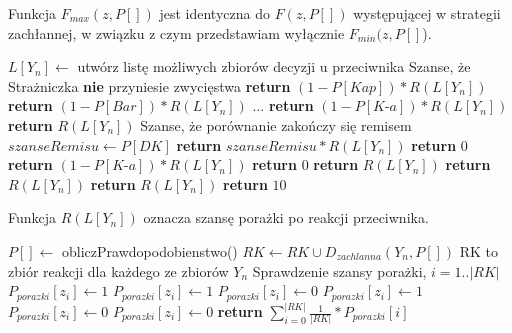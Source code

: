 Funkcja $F_{max}(z, P[])$ jest identyczna do $F(z, P[])$ występującej w strategii zachłannej, w związku z czym przedstawiam wyłącznie $F_{min}(z, P[]$).
\begin{algorithmic}[1]
		\State $L[Y_n] \gets$ utwórz listę możliwych zbiorów decyzji u przeciwnika 
			 \Comment Szanse, że Strażniczka \textbf{nie} przyniesie zwycięstwa
				\State \textbf{return} $ (1 - P[Kap]) * R(L[Y_n]) $
			\EndCase
				\State \textbf{return} $ (1 - P[Bar]) * R(L[Y_n]) $
			\EndCase
				\State ...
				\State \textbf{return} $ (1 - P[\textit{K-a}]) * R(L[Y_n]) $
			\EndCase
				\State \textbf{return} $  R(L[Y_n]) $
			\EndCase
				\Comment Szanse, że porównanie zakończy się remisem 
				\State $ szanseRemisu \gets P[DK]$ 
				\State \textbf{return} $ szanseRemisu * R(L[Y_n]) $
			\EndCase
				\State \textbf{return} $ 0 $
			\EndCase
				\State \textbf{return} $ (1 - P[\textit{K-a}]) * R(L[Y_n]) $
			\EndCase
					\State \textbf{return} $ 0 $
				\Else
					\State \textbf{return} $ R(L[Y_n]) $
				\EndIf
			\EndCase
				\State \textbf{return} $ R(L[Y_n]) $
			\EndCase
				\State \textbf{return} $ R(L[Y_n]) $
			\EndCase
			\State \textbf{return} $ 10 $
			\EndCase
		\EndSwitch
	\EndFunction
\end{algorithmic}

Funkcja $R(L[Y_n])$ oznacza szansę porażki po reakcji przeciwnika.
\begin{algorithmic}[1]
			\State $P[] \gets$ obliczPrawdopodobienstwo()
			\State $RK \gets RK \cup D_{zachlanna}(Y_n, P[]) $	\Comment RK to zbiór reakcji dla każdego ze zbiorów $Y_n$
		\EndFor
			\Comment Sprawdzenie szansy porażki, $i=1..|RK|$
					\State $P_{porazki}[z_i] \gets 1$
				\EndCase
						\State $P_{porazki}[z_i] \gets 1$
					\Else
						\State $P_{porazki}[z_i] \gets 0$
					\EndIf
				\EndCase
						\State $P_{porazki}[z_i] \gets 1$
					\Else
						\State $P_{porazki}[z_i] \gets 0$
					\EndIf
				\EndCase
					$P_{porazki}[z_i] \gets 0$
				\EndCase
			\EndSwitch
		\EndFor
		\State \textbf{return} $ \sum_{i=0}^{|RK|} \frac{1}{|RK|} * P_{porazki}[i] $
	\EndFunction
\end{algorithmic}


